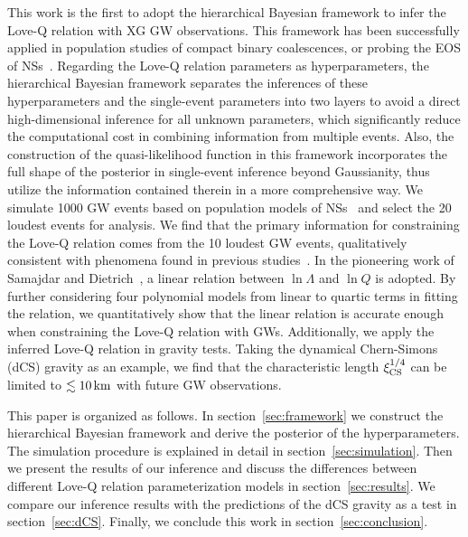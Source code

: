 \documentclass[a4paper,11pt]{article}
\begin{document}
This work is the first to adopt the hierarchical Bayesian framework to infer the Love-Q relation with XG GW observations.
This framework has been successfully applied in 
population studies of compact binary coalescences, or probing the EOS of NSs~\cite{Mandel:2009nx,Mandel:2009pc,Adams:2012qw,Lackey:2014fwa,Mandel:2018mve,Golomb:2021tll,KAGRA:2021duu,Wang:2024xon}. 
Regarding the Love-Q relation parameters as hyperparameters, the hierarchical 
Bayesian framework separates the inferences of these hyperparameters and the 
single-event parameters into two layers to avoid a direct high-dimensional inference
for all unknown parameters, which significantly reduce the computational cost
in combining information from multiple events.
 Also, the construction of the quasi-likelihood
function in this framework incorporates the full shape of the
posterior in single-event inference beyond Gaussianity, thus
utilize the information contained therein in a more comprehensive way.
We simulate 1000 GW events based on population models of
NSs~\cite{Fishbach:2018edt,Farrow:2019xnc,Samajdar:2020xrd} and select the 20
loudest events for analysis. We find that the primary information for
constraining the Love-Q relation comes from the 10 loudest GW events,
qualitatively consistent
with phenomena found in
previous studies~\cite{Lackey:2014fwa}. In the pioneering work of Samajdar and
Dietrich~\cite{Samajdar:2020xrd}, a linear relation between $\ln\Lambda$ and $\ln Q$
is adopted. By further considering four polynomial models
from linear to quartic terms in fitting the relation, we quantitatively show
 that
the linear relation is accurate enough when constraining the Love-Q relation
with GWs. Additionally, we apply the inferred Love-Q relation in gravity tests.
Taking the dynamical Chern-Simons (dCS) gravity as an example, we find that the
characteristic length $\xi_{\rm CS}^{1/4}$ can be limited to $\lesssim 10\,{\rm km}$
with future GW observations. 

This paper is organized as follows. In section~\ref{sec:framework} we construct 
the hierarchical Bayesian framework and derive the posterior of the hyperparameters. 
The simulation procedure is explained in detail in section~\ref{sec:simulation}. 
Then we present the results of our inference and discuss the differences between different 
Love-Q relation parameterization models in section~\ref{sec:results}. 
We compare our inference results with the predictions of the dCS 
gravity as a test in section~\ref{sec:dCS}. Finally, we conclude this work in section~\ref{sec:conclusion}.
\end{document}
